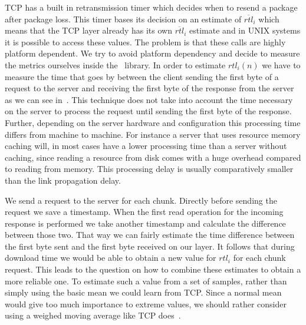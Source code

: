 TCP has a built in retransmission timer which decides when to resend a package after package loss. 
This timer bases its decision on an estimate of $\overline{rtl}_i$ which means that the TCP layer already has its own $\overline{rtl}_i$ estimate and in UNIX systems it is possible to access these values. 
The problem is that these calls are highly platform dependent. 
We try to avoid platform dependency and decide to measure the metrics ourselves inside the \mhttp~library. 
In order to estimate $rtl_i(n)$ we have to measure the time that goes by between the client sending the first byte of a request to the server and receiving the first byte of the response from the server as we can see in~. 
This technique does not take into account the time necessary on the server to process the request until sending the first byte of the response. 
Further, depending on the server hardware and configuration this processing time differs from machine to machine. 
For instance a server that uses resource memory caching will, in most cases have a lower processing time than a server without caching, since reading a resource from disk comes with a huge overhead compared to reading from memory. 
This processing delay is usually comparatively smaller than the link propagation delay. 

We send a request to the server for each chunk. 
Directly before sending the request we save a timestamp. 
When the first read operation for the incoming response is performed we take another timestamp and calculate the difference between those two. 
That way we can fairly estimate the time difference between the first byte sent and the first byte received on our layer. 
It follows that during download time we would be able to obtain a new value for $rtl_{i}$ for each chunk request. 
This leads to the question on how to combine these estimates to obtain a more reliable one.
To estimate such a value from a set of samples, rather than simply using the basic mean we could learn from TCP. 
Since a normal mean would give too much importance to extreme values, we should rather consider using a weighed moving average like TCP does~\cite{RFC-6298}. 

